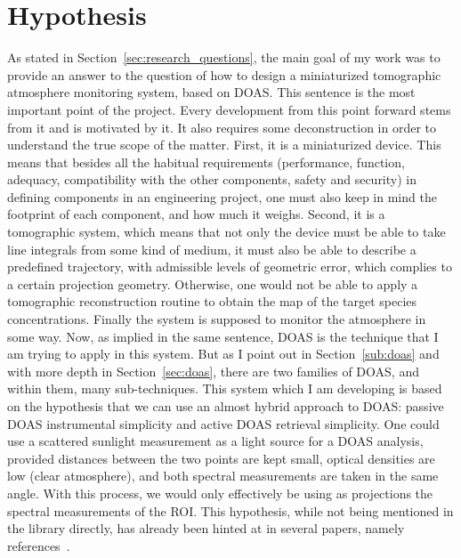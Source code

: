 

\section{Hypothesis}%
\label{sec:intro_hypothesis}

As stated in Section~\ref{sec:research_questions}, the main goal of my
work was to provide an answer to the question of how to design a
miniaturized tomographic atmosphere monitoring system, based on
\gls{DOAS}.  This sentence is the most important point of the project.
Every development from this point forward stems from it and is motivated
by it. It also requires some deconstruction in order to understand the
true scope of the matter. First, it is a miniaturized device. This means
that besides all the habitual requirements (performance, function,
adequacy, compatibility with the other components, safety and security)
in defining components in an engineering project, one must also keep in
mind the footprint of each component, and how much it weighs. Second, it
is a tomographic system, which means that not only the device must be
able to take line integrals from some kind of medium, it must also be
able to describe a predefined trajectory, with admissible levels of
geometric error, which complies to a certain projection geometry.
Otherwise, one would not be able to apply a tomographic reconstruction
routine to obtain the map of the target species concentrations. Finally
the system is supposed to monitor the atmosphere in some way. Now, as
implied in the same sentence, \gls{DOAS} is the technique that I am
trying to apply in this system. But as I point out in
Section~\ref{sub:doas} and with more depth in Section~\ref{sec:doas},
there are two families of \gls{DOAS}, and within them, many
sub-techniques. This system which I am developing is based on the
hypothesis that we can use an almost hybrid approach to \gls{DOAS}:
passive \gls{DOAS} instrumental simplicity and active \gls{DOAS}
retrieval simplicity. One could use a scattered sunlight measurement as
a light source for a \gls{DOAS} analysis, provided distances between the
two points are kept small, optical densities are low (clear atmosphere),
and both spectral measurements are taken in the same angle. With this
process, we would only effectively be using as projections the spectral
measurements of the \gls{ROI}. This hypothesis, while not being
mentioned in the library directly, has already been hinted at in several
papers, namely references~\cite{Frins2006, Casaballe2017,
Johansson2009}.
